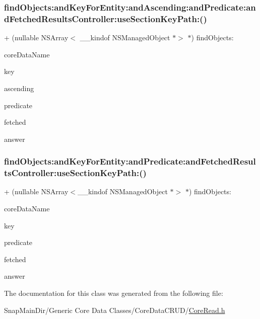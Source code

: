\subsubsection{\texorpdfstring{find\+Objects\+:and\+Key\+For\+Entity\+:and\+Ascending\+:and\+Predicate\+:and\+Fetched\+Results\+Controller\+:use\+Section\+Key\+Path\+:()}{findObjects:andKeyForEntity:andAscending:andPredicate:andFetchedResultsController:useSectionKeyPath:()}}
{\footnotesize\ttfamily + (nullable N\+S\+Array$<$ \+\_\+\+\_\+kindof N\+S\+Managed\+Object $\ast$$>$ $\ast$) find\+Objects\+: \begin{DoxyParamCaption}\item[{(N\+S\+String $\ast$)}]{core\+Data\+Name }\item[{andKeyForEntity:(N\+S\+String $\ast$)}]{key }\item[{andAscending:(B\+O\+OL)}]{ascending }\item[{andPredicate:(N\+S\+Predicate $\ast$)}]{predicate }\item[{andFetchedResultsController:(N\+S\+Fetched\+Results\+Controller $\ast$)}]{fetched }\item[{useSectionKeyPath:(B\+O\+OL)}]{answer }\end{DoxyParamCaption}}

\hypertarget{interface_core_read_a2e3b45347ade1da22f0df0829e405fee}{}\label{interface_core_read_a2e3b45347ade1da22f0df0829e405fee} 
\subsubsection{\texorpdfstring{find\+Objects\+:and\+Key\+For\+Entity\+:and\+Predicate\+:and\+Fetched\+Results\+Controller\+:use\+Section\+Key\+Path\+:()}{findObjects:andKeyForEntity:andPredicate:andFetchedResultsController:useSectionKeyPath:()}}
{\footnotesize\ttfamily + (nullable N\+S\+Array$<$\+\_\+\+\_\+kindof N\+S\+Managed\+Object $\ast$$>$ $\ast$) find\+Objects\+: \begin{DoxyParamCaption}\item[{(N\+S\+String $\ast$)}]{core\+Data\+Name }\item[{andKeyForEntity:(N\+S\+String $\ast$)}]{key }\item[{andPredicate:(N\+S\+Predicate $\ast$)}]{predicate }\item[{andFetchedResultsController:(N\+S\+Fetched\+Results\+Controller $\ast$)}]{fetched }\item[{useSectionKeyPath:(B\+O\+OL)}]{answer }\end{DoxyParamCaption}}



The documentation for this class was generated from the following file\+:\begin{DoxyCompactItemize}
\item 
Snap\+Main\+Dir/\+Generic Core Data Classes/\+Core\+Data\+C\+R\+U\+D/\hyperlink{_core_read_8h}{Core\+Read.\+h}\end{DoxyCompactItemize}
